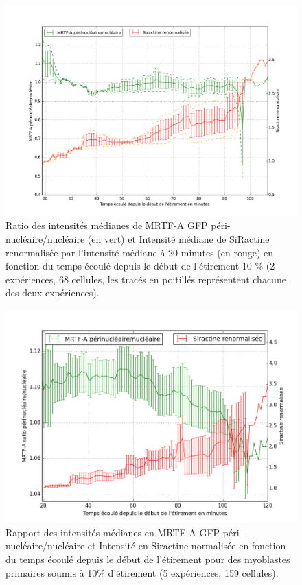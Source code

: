 \documentclass                                                                                                                                                                                                                                                                                                                                       {report}
\begin{document}
\begin{figure}[p]
\includegraphics[scale=0.4]{Figures/C2C12.png} 
\caption{Ratio des intensités médianes de MRTF-A GFP péri-nucléaire/nucléaire (en vert) et Intensité médiane de SiRactine renormalisée par l'intensité médiane à 20 minutes (en rouge)  en fonction du temps écoulé depuis le début de l'étirement 10 \% (2 expériences, 68 cellules, les tracés en poitillés représentent chacune des deux expériences).\label{Siractine_quantif}}
\end{figure}

\begin{figure}[p]
\includegraphics[scale=0.4]{Figures/Siractine_MRTFA_vs_temps.png} 
\caption{Rapport des intensités médianes en MRTF-A GFP  péri-nucléaire/nucléaire et Intensité en Siractine normalisée en fonction du temps écoulé depuis le début de l'étirement pour des myoblastes primaires soumis à 10\% d'étirement (5 expériences, 159 cellules). \label{myoblastes_Sir}}
\end{figure}
\end{document}
